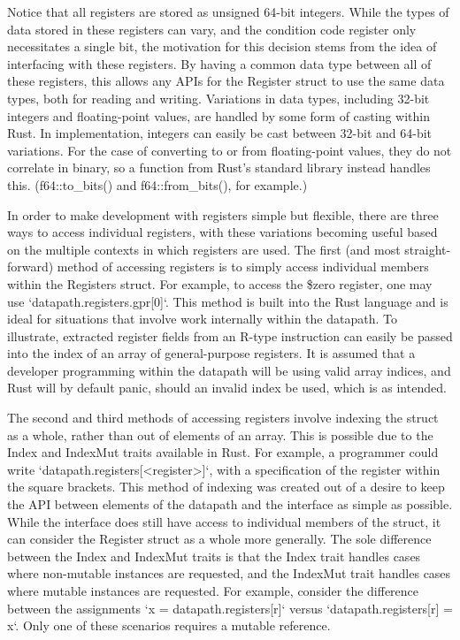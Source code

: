 \documentclass[
    paper=letter,
    parskip=half,
    fontsize=12pt,
    titlepage=firstiscover,
    toc=bibliography,
    numbers=endperiod
]{scrartcl}
\begin{document}
Notice that all registers are stored as unsigned 64-bit integers. While
the types of data stored in these registers can vary, and the condition
code register only necessitates a single bit, the motivation for this
decision stems from the idea of interfacing with these registers. By
having a common data type between all of these registers, this allows
any APIs for the Register struct to use the same data types, both for
reading and writing. Variations in data types, including 32-bit integers
and floating-point values, are handled by some form of casting within
Rust. In implementation, integers can easily be cast between 32-bit and
64-bit variations. For the case of converting to or from floating-point
values, they do not correlate in binary, so a function from Rust's
standard library instead handles this. (f64::to\_bits() and
f64::from\_bits(), for example.)

In order to make development with registers simple but flexible, there
are three ways to access individual registers, with these variations
becoming useful based on the multiple contexts in which registers are
used. The first (and most straight-forward) method of accessing
registers is to simply access individual members within the Registers
struct. For example, to access the \$zero register, one may use
`datapath.registers.gpr{[}0{]}`. This method is built into the Rust
language and is ideal for situations that involve work internally within
the datapath. To illustrate, extracted register fields from an R-type
instruction can easily be passed into the index of an array of
general-purpose registers. It is assumed that a developer programming
within the datapath will be using valid array indices, and Rust will by
default panic, should an invalid index be used, which is as intended.

The second and third methods of accessing registers involve indexing the
struct as a whole, rather than out of elements of an array. This is
possible due to the Index and IndexMut traits available in Rust. For
example, a programmer could write
`datapath.registers{[}\textless register\textgreater{]}`, with a
specification of the register within the square brackets. This method of
indexing was created out of a desire to keep the API between elements of
the datapath and the interface as simple as possible. While the
interface does still have access to individual members of the struct, it
can consider the Register struct as a whole more generally. The sole
difference between the Index and IndexMut traits is that the Index trait
handles cases where non-mutable instances are requested, and the
IndexMut trait handles cases where mutable instances are requested. For
example, consider the difference between the assignments `x =
datapath.registers{[}r{]}` versus `datapath.registers{[}r{]} = x`. Only
one of these scenarios requires a mutable reference.
\end{document}
